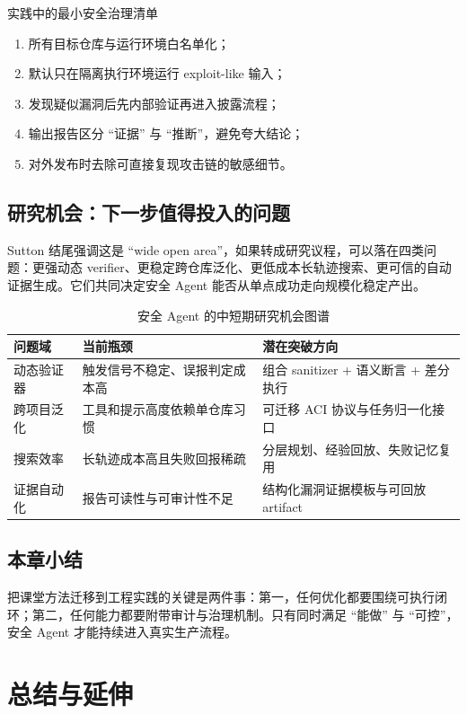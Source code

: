 \documentclass[a4paper]{article}
\begin{document}
\begin{importantbox}{实践中的最小安全治理清单}
\begin{enumerate}
    \item 所有目标仓库与运行环境白名单化；
    \item 默认只在隔离执行环境运行 exploit-like 输入；
    \item 发现疑似漏洞后先内部验证再进入披露流程；
    \item 输出报告区分 ``证据'' 与 ``推断''，避免夸大结论；
    \item 对外发布时去除可直接复现攻击链的敏感细节。
\end{enumerate}
\end{importantbox}

\subsection{研究机会：下一步值得投入的问题}
Sutton 结尾强调这是 ``wide open area''，如果转成研究议程，可以落在四类问题：更强动态 verifier、更稳定跨仓库泛化、更低成本长轨迹搜索、更可信的自动证据生成。它们共同决定安全 Agent 能否从单点成功走向规模化稳定产出。

\begin{table}[H]
\centering
\begin{tabular}{p{3.0cm}p{4.4cm}p{4.8cm}}
\toprule
\textbf{问题域} & \textbf{当前瓶颈} & \textbf{潜在突破方向} \\
\midrule
动态验证器 & 触发信号不稳定、误报判定成本高 & 组合 sanitizer + 语义断言 + 差分执行 \\
跨项目泛化 & 工具和提示高度依赖单仓库习惯 & 可迁移 ACI 协议与任务归一化接口 \\
搜索效率 & 长轨迹成本高且失败回报稀疏 & 分层规划、经验回放、失败记忆复用 \\
证据自动化 & 报告可读性与可审计性不足 & 结构化漏洞证据模板与可回放 artifact \\
\bottomrule
\end{tabular}
\caption{安全 Agent 的中短期研究机会图谱}
\end{table}

\subsection{本章小结}
把课堂方法迁移到工程实践的关键是两件事：第一，任何优化都要围绕可执行闭环；第二，任何能力都要附带审计与治理机制。只有同时满足 ``能做'' 与 ``可控''，安全 Agent 才能持续进入真实生产流程。

\section{总结与延伸}
\end{document}
